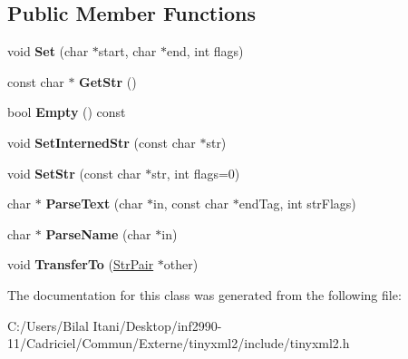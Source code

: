 \subsection*{Public Member Functions}
\begin{DoxyCompactItemize}
\item 
void {\bfseries Set} (char $\ast$start, char $\ast$end, int flags)\hypertarget{classtinyxml2_1_1_str_pair_a4f05549373394266a1eecba26813c166}{}\label{classtinyxml2_1_1_str_pair_a4f05549373394266a1eecba26813c166}

\item 
const char $\ast$ {\bfseries Get\+Str} ()\hypertarget{classtinyxml2_1_1_str_pair_a27290a8fec20c0a6ccf9d8362f5c3b1d}{}\label{classtinyxml2_1_1_str_pair_a27290a8fec20c0a6ccf9d8362f5c3b1d}

\item 
bool {\bfseries Empty} () const \hypertarget{classtinyxml2_1_1_str_pair_affa1043e73a18f05d5d2faec055725a7}{}\label{classtinyxml2_1_1_str_pair_affa1043e73a18f05d5d2faec055725a7}

\item 
void {\bfseries Set\+Interned\+Str} (const char $\ast$str)\hypertarget{classtinyxml2_1_1_str_pair_a2baf6230e18333e02ab65d0897ee3941}{}\label{classtinyxml2_1_1_str_pair_a2baf6230e18333e02ab65d0897ee3941}

\item 
void {\bfseries Set\+Str} (const char $\ast$str, int flags=0)\hypertarget{classtinyxml2_1_1_str_pair_a1f82ec6b5bee35ee7466d8565e43b1de}{}\label{classtinyxml2_1_1_str_pair_a1f82ec6b5bee35ee7466d8565e43b1de}

\item 
char $\ast$ {\bfseries Parse\+Text} (char $\ast$in, const char $\ast$end\+Tag, int str\+Flags)\hypertarget{classtinyxml2_1_1_str_pair_a7ff60a4aaea3ad696e940ecd31806a29}{}\label{classtinyxml2_1_1_str_pair_a7ff60a4aaea3ad696e940ecd31806a29}

\item 
char $\ast$ {\bfseries Parse\+Name} (char $\ast$in)\hypertarget{classtinyxml2_1_1_str_pair_a8452c0c7f140d4d613134e952ce54f14}{}\label{classtinyxml2_1_1_str_pair_a8452c0c7f140d4d613134e952ce54f14}

\item 
void {\bfseries Transfer\+To} (\hyperlink{classtinyxml2_1_1_str_pair}{Str\+Pair} $\ast$other)\hypertarget{classtinyxml2_1_1_str_pair_a35f795b1557fe5fdcbd93d3cc5d6b939}{}\label{classtinyxml2_1_1_str_pair_a35f795b1557fe5fdcbd93d3cc5d6b939}

\end{DoxyCompactItemize}


The documentation for this class was generated from the following file\+:\begin{DoxyCompactItemize}
\item 
C\+:/\+Users/\+Bilal Itani/\+Desktop/inf2990-\/11/\+Cadriciel/\+Commun/\+Externe/tinyxml2/include/tinyxml2.\+h\end{DoxyCompactItemize}
